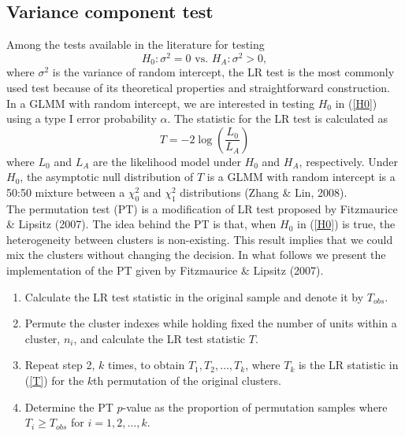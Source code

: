 \documentclass{sciposter}
\begin{document}
\begin{boldmath}
\begin{multicols}{3}
\section{Variance component test}
Among the tests available in the literature for testing 
\begin{equation}\label{H0}
H_0:\sigma^2=0 \text{ vs. } H_A:\sigma^2>0, 
\end{equation}
where $\sigma^2$ is the variance of random intercept, the LR test is the most commonly used test because of its theoretical properties and straightforward construction. In a GLMM with random intercept, we are interested in testing $H_0$ in (\ref{H0}) using a type I error probability $\alpha$. The statistic for the LR test is calculated as 
\begin{equation} \label{T}
T=-2\log \left( \frac{L_0}{L_A} \right)
\end{equation}
where $L_0$ and $L_A$ are the likelihood model under $H_0$ and $H_A$, respectively. Under $H_0$, the asymptotic null distribution of $T$ is a GLMM with random intercept is a 50:50 mixture between a $\chi_0^2$ and $\chi_1^2$ distributions (Zhang \& Lin, 2008).\\

The permutation test (PT) is a modification of LR test proposed by Fitzmaurice \& Lipsitz (2007). The idea behind the PT is that, when $H_0$ in (\ref{H0}) is true, the heterogeneity between clusters is non-existing. This result implies that we could mix the clusters without changing the decision. In what follows we present the implementation of the PT given by Fitzmaurice \& Lipsitz (2007).\\ 

\begin{enumerate}
	\item Calculate the LR test statistic in the original sample and denote it by $T_{obs}$.
	\item Permute the cluster indexes while holding fixed the number of units within a cluster, $n_i$, and calculate the LR test statistic $T$.
	\item Repeat step 2, $k$ times, to obtain $T_1,T_2,\ldots,T_k$, where $T_k$ is the LR statistic in (\ref{T}) for the $k$th permutation of the original clusters.
	\item Determine the PT  $p$-value as the proportion of permutation samples where $T_i\geq T_{obs}$ for $i=1,2,\ldots,k$.
\end{enumerate}


\end{multicols}
\end{boldmath}
\end{document}

